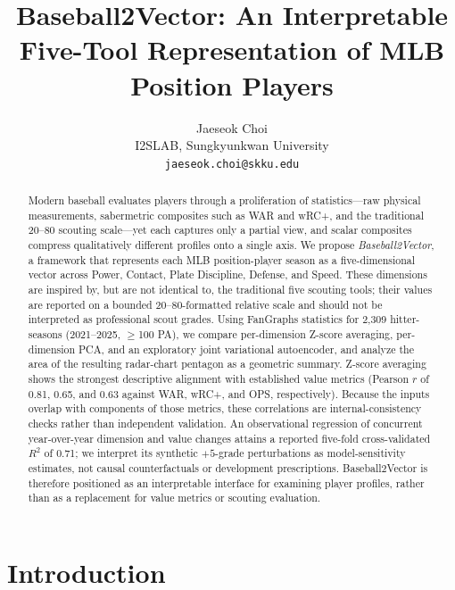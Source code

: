 \documentclass[10pt,twocolumn,letterpaper]{article}
\begin{document}
\title{Baseball2Vector: An Interpretable Five-Tool Representation of MLB Position Players}

\author{Jaeseok Choi\\
I2SLAB, Sungkyunkwan University\\
{\tt\small jaeseok.choi@skku.edu}
}

\maketitle

\begin{abstract}
Modern baseball evaluates players through a proliferation of statistics---raw physical measurements, sabermetric composites such as WAR and wRC+, and the traditional 20--80 scouting scale---yet each captures only a partial view, and scalar composites compress qualitatively different profiles onto a single axis. We propose \emph{Baseball2Vector}, a framework that represents each MLB position-player season as a five-dimensional vector across Power, Contact, Plate Discipline, Defense, and Speed. These dimensions are inspired by, but are not identical to, the traditional five scouting tools; their values are reported on a bounded 20--80-formatted relative scale and should not be interpreted as professional scout grades. Using FanGraphs statistics for 2{,}309 hitter-seasons (2021--2025, $\geq$100 PA), we compare per-dimension Z-score averaging, per-dimension PCA, and an exploratory joint variational autoencoder, and analyze the area of the resulting radar-chart pentagon as a geometric summary. Z-score averaging shows the strongest descriptive alignment with established value metrics (Pearson $r$ of 0.81, 0.65, and 0.63 against WAR, wRC+, and OPS, respectively). Because the inputs overlap with components of those metrics, these correlations are internal-consistency checks rather than independent validation. An observational regression of concurrent year-over-year dimension and value changes attains a reported five-fold cross-validated $R^2$ of 0.71; we interpret its synthetic $+5$-grade perturbations as model-sensitivity estimates, not causal counterfactuals or development prescriptions. Baseball2Vector is therefore positioned as an interpretable interface for examining player profiles, rather than as a replacement for value metrics or scouting evaluation.
\end{abstract}

\section{Introduction}
\label{sec:intro}
\end{document}
